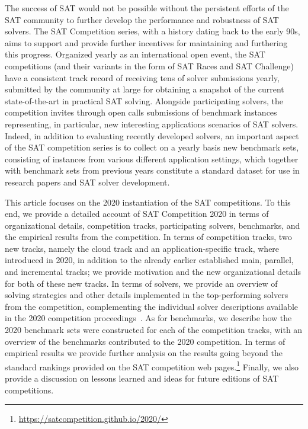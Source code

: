 \documentclass{elsarticle}
\begin{document}
The success of SAT would not be possible without the persistent efforts of the SAT community to further develop the performance and robustness
of SAT solvers. The SAT Competition series, with a history dating back to the early 90s, aims to support and provide further incentives 
for maintaining and furthering this progress. Organized yearly as an international open event, the SAT competitions (and their variants
in the form of SAT Races and SAT Challenge)~\cite{DBLP:journals/amai/SimonBH05,DBLP:conf/sat/BerreS03,DBLP:conf/sat/BerreS04,DBLP:journals/aim/JarvisaloBRS12,DBLP:journals/ai/BalintBJS15,DBLP:conf/aaai/BalyoHJ17,DBLP:journals/jsat/HeuleJS19}
 have a consistent track record of receiving tens of solver submissions yearly, submitted
by the community at large for obtaining a snapshot of the current state-of-the-art in practical SAT solving. Alongside participating solvers,
the competition invites through open calls submissions of benchmark instances representing, in particular, new interesting applications 
scenarios of SAT solvers. Indeed, in addition to evaluating recently developed solvers, an important aspect of the SAT competition series is
to collect on a yearly basis new benchmark sets, consisting of instances from various different application settings, which together with benchmark sets from previous years constitute a standard dataset for use in research papers and SAT solver development. 

This article focuses on the 2020 instantiation of the SAT competitions. 
To this end, we provide
a detailed account of SAT Competition 2020 in terms of organizational details, competition tracks,
participating solvers, benchmarks, and the empirical results from the competition.
In terms of competition tracks, two new tracks, namely the cloud track and an application-specific track, where introduced in 2020,
in addition to the already earlier established main, parallel, and incremental tracks; we
provide motivation and the new organizational details for both of these new tracks.
In terms of solvers, we provide an overview of solving strategies and other details implemented in the top-performing solvers
from the competition, complementing the individual solver descriptions available in the 2020 competition proceedings~\cite{SC2020}.
 As for benchmarks, we describe how the 2020 benchmark sets were constructed for each of the competition tracks, with 
an overview of the benchmarks contributed to the 2020 competition.
In terms of empirical results we provide further analysis on the results going beyond the standard rankings provided
on the SAT competition web pages.\footnote{\url{https://satcompetition.github.io/2020/}}
Finally, we also provide a discussion on lessons learned and ideas for future editions of SAT competitions.
\end{document}
